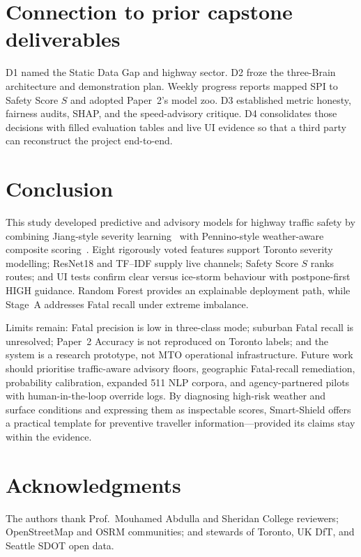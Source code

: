 \documentclass[11pt,a4paper]{article}
\begin{document}
\section{Connection to prior capstone deliverables}
\label{sec:thread}

D1 named the Static Data Gap and highway sector. D2 froze the three-Brain architecture and demonstration plan. Weekly progress reports mapped SPI to Safety Score $S$ and adopted Paper~2's model zoo. D3 established metric honesty, fairness audits, SHAP, and the speed-advisory critique. D4 consolidates those decisions with filled evaluation tables and live UI evidence so that a third party can reconstruct the project end-to-end.

\section{Conclusion}
\label{sec:conclusion}

This study developed predictive and advisory models for highway traffic safety by combining Jiang-style severity learning~\citep{jiang2024traffic} with Pennino-style weather-aware composite scoring~\citep{pennino2024weather}. Eight rigorously voted features support Toronto severity modelling; ResNet18 and TF--IDF supply live channels; Safety Score $S$ ranks routes; and UI tests confirm clear versus ice-storm behaviour with postpone-first HIGH guidance. Random Forest provides an explainable deployment path, while Stage~A addresses Fatal recall under extreme imbalance.

Limits remain: Fatal precision is low in three-class mode; suburban Fatal recall is unresolved; Paper~2 Accuracy is not reproduced on Toronto labels; and the system is a research prototype, not MTO operational infrastructure. Future work should prioritise traffic-aware advisory floors, geographic Fatal-recall remediation, probability calibration, expanded 511 NLP corpora, and agency-partnered pilots with human-in-the-loop override logs. By diagnosing high-risk weather and surface conditions and expressing them as inspectable scores, Smart-Shield offers a practical template for preventive traveller information---provided its claims stay within the evidence.

\section*{Acknowledgments}
The authors thank Prof.\ Mouhamed Abdulla and Sheridan College reviewers; OpenStreetMap and OSRM communities; and stewards of Toronto, UK DfT, and Seattle SDOT open data.
\end{document}
